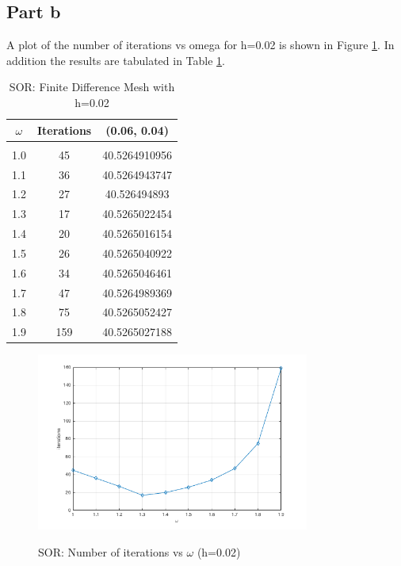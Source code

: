 \documentclass[11pt]{amsart}
\begin{document}
\subsection*{Part b}
A plot of the number of iterations vs omega for h=0.02 is shown in Figure \ref{fig:itr_vs_omega}. In addition the results are tabulated in Table \ref{tbl:fdm_mesh_1}.

\begin{table}[h!]
    \caption{SOR: Finite Difference Mesh with h=0.02}
    \label{tbl:fdm_mesh_1}
    \begin{tabular}{ c | c | c}
    	\textbf{$\omega$} & \textbf{Iterations} & \textbf{(0.06, 0.04)}\\ \hline \\
	1.0 & 45 & 40.5264910956\\
	1.1 & 36 & 40.5264943747\\
	1.2 & 27 & 40.526494893\\
	1.3 & 17 & 40.5265022454\\
	1.4 & 20 & 40.5265016154\\
	1.5 & 26 & 40.5265040922\\
	1.6 & 34 & 40.5265046461\\
	1.7 & 47 & 40.5264989369\\
	1.8 & 75 & 40.5265052427\\
	1.9 & 159 & 40.5265027188
    \end{tabular}
\end{table}
\begin{center}
	\begin{figure}[h]
		\caption{SOR: Number of iterations vs $\omega$ (h=0.02)}
		\includegraphics[width=0.8\textwidth]{assets/itr_vs_omega.png}\label{fig:itr_vs_omega}
	\end{figure}
\end{center}
\end{document}
